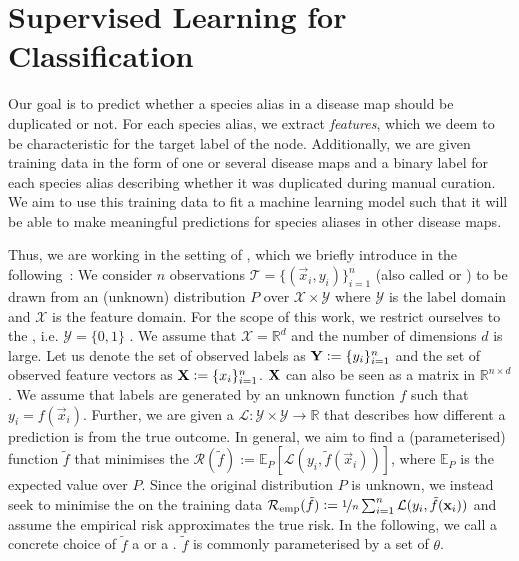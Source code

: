 \documentclass[
	fontsize=10pt, %
	twoside=true, %
	secnumdepth=1, %
  toc=indentunnumbered %
]{kaobook}
\begin{document}
\section{Supervised Learning for Classification}
\label{sec:supervised-learning}
Our goal is to predict whether a species alias in a disease map
should be duplicated or not. For each species alias, we extract 
\textit{features}, which we deem to be characteristic for the target label of
the node.
Additionally, we are given training
data in the form of one or several disease maps and a binary label for each
species alias describing whether it was duplicated during manual curation. We
aim to use this training data to fit a machine learning model such that it will
be able to make meaningful predictions for species aliases in other disease
maps.

Thus, we are working in the setting of , which we
briefly introduce in the
following~\cite{vapnik_PrinciplesRiskMinimization_,bronstein_geometric_2021}:
We consider $n$ observations $\mathcal{T} = \{(\vec x_i, y_i)\}_{i=1}^n$ (also
called  or ) to be drawn from an (unknown)
distribution $P$ over $\mathcal{X} \times \mathcal{Y}$ where $\mathcal{Y}$ is
the label domain and $\mathcal{X}$ is the feature domain. For the scope of this
work, we restrict ourselves to the , i.e.
$\mathcal{Y} = \{0,1\}$ . We assume that $\mathcal{X} = \mathbb{R}^d$ and the
number of dimensions $d$ is large. Let us denote the set of
observed  labels as $\mat Y := \{y_i\}_{i=1}^n$ and the set of
observed feature vectors as $\mat X := \{x_i\}_{i=1}^n$. $\mat X$ can also be
seen as a matrix in $\mathbb{R}^{n \times d}$.
%
We assume that labels are generated by an unknown function $f$ such that $y_i
= f(\vec x_i)$.
%
Further, we are given a  $\mathcal{L} :
\mathcal{Y} \times \mathcal{Y} \rightarrow \mathbb{R}$ that describes how
different a prediction is from the true outcome.
%
In general, we aim to find a (parameterised) function $\tilde f$ that minimises
the  $\mathcal{R}(\tilde f) := \mathbb{E}_P\left[ \mathcal{L}(y_i,
    \tilde f(\vec x_i)) \right]$, where $\mathbb{E}_P$ is the expected value
over $P$.
%
Since the original distribution $P$ is unknown, we instead seek to minimise the 
  on the training data
$\mathcal{R}_{\text{emp}}(\tilde f) := \nicefrac{1}{n}
\sum_{i=1}^n \mathcal{L}(y_i, \tilde f(\vec x_i))$ and assume the empirical risk
approximates the true risk.
%
In the following, we call a concrete choice of $\tilde f$ a  or a
. $\tilde f$ is commonly parameterised by a set of 
$\theta$.
\end{document}
